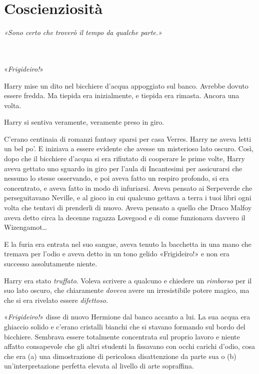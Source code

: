 
\chapter{Coscienziosità}
\label{capitolo:15}

\emph{«Sono certo che troverò il tempo da qualche parte.»}

~\\
~\\

«\textit{Frigideiro!}»

Harry mise un dito nel bicchiere d’acqua appoggiato sul banco. Avrebbe dovuto essere fredda. Ma tiepida era inizialmente, e tiepida era rimasta. Ancora una volta.

Harry si sentiva veramente, veramente preso in giro.

C’erano centinaia di romanzi fantasy sparsi per casa Verres. Harry ne aveva letti un bel po’. E iniziava a essere evidente che avesse un misterioso lato oscuro. Così, dopo che il bicchiere d’acqua si era rifiutato di cooperare le prime volte, Harry aveva gettato uno sguardo in giro per l’aula di Incantesimi per assicurarsi che nessuno lo stesse osservando, e poi aveva fatto un respiro profondo, si era concentrato, e aveva fatto in modo di infuriarsi. Aveva pensato ai Serpeverde che perseguitavano Neville, e al gioco in cui qualcuno gettava a terra i tuoi libri ogni volta che tentavi di prenderli di nuovo. Aveva pensato a quello che Draco Malfoy aveva detto circa la decenne ragazza Lovegood e di come funzionava davvero il Wizengamot…

E la furia era entrata nel suo sangue, aveva tenuto la bacchetta in una mano che tremava per l’odio e aveva detto in un tono gelido «Frigideiro!» e non era successo assolutamente niente.

Harry era stato \textit{truffato}. Voleva scrivere a qualcuno e chiedere un \textit{rimborso} per il suo lato oscuro, che chiaramente \textit{doveva} avere un irresistibile potere magico, ma che si era rivelato essere \textit{difettoso}.

«\textit{Frigideiro!}» disse di nuovo Hermione dal banco accanto a lui. La sua acqua era ghiaccio solido e c’erano cristalli bianchi che si stavano formando sul bordo del bicchiere. Sembrava essere totalmente concentrata sul proprio lavoro e niente affatto consapevole che gli altri studenti la fissavano con occhi carichi d’odio, cosa che era (a) una dimostrazione di pericolosa disattenzione da parte sua o (b) un’interpretazione perfetta elevata al livello di arte sopraffina.

